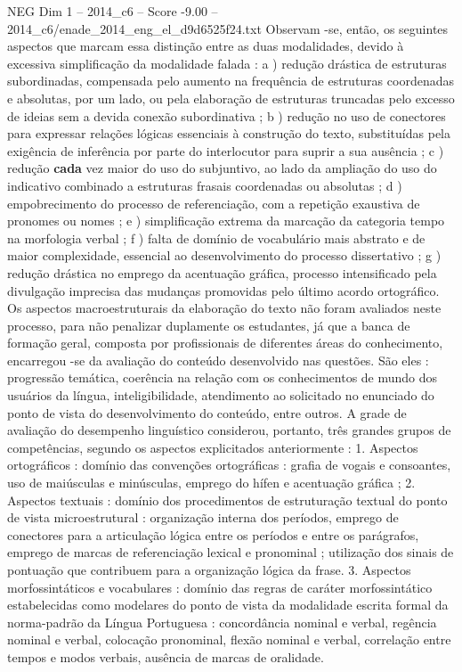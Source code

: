 \begin{textsample}{NEG Dim 1 – 2014\_c6 – Score -9.00 – 2014\_c6/enade\_2014\_eng\_el\_d9d6525f24.txt}
Observam -se, então, os seguintes aspectos que marcam essa distinção entre as duas modalidades, devido à excessiva simplificação da modalidade falada : a ) redução drástica de estruturas subordinadas, compensada pelo aumento na frequência de estruturas coordenadas e absolutas, por um lado, ou pela elaboração de estruturas truncadas pelo excesso de ideias sem a devida conexão subordinativa ; b ) redução no uso de conectores para expressar relações lógicas essenciais à construção do texto, substituídas pela exigência de inferência por parte do interlocutor para suprir a sua ausência ; c ) redução \textbf{cada} vez maior do uso do subjuntivo, ao lado da ampliação do uso do indicativo combinado a estruturas frasais coordenadas ou absolutas ; d ) empobrecimento do processo de referenciação, com a repetição exaustiva de pronomes ou nomes ; e ) simplificação extrema da marcação da categoria tempo na morfologia verbal ; f ) falta de domínio de vocabulário mais abstrato e de maior complexidade, essencial ao desenvolvimento do processo dissertativo ; g ) redução drástica no emprego da acentuação gráfica, processo intensificado pela divulgação imprecisa das mudanças promovidas pelo último acordo ortográfico.
Os aspectos macroestruturais da elaboração do texto não foram avaliados neste processo, para não penalizar duplamente os estudantes, já que a banca de formação geral, composta por profissionais de diferentes áreas do conhecimento, encarregou -se da avaliação do conteúdo desenvolvido nas questões.
São eles : progressão temática, coerência na relação com os conhecimentos de mundo dos usuários da língua, inteligibilidade, atendimento ao solicitado no enunciado do ponto de vista do desenvolvimento do conteúdo, entre outros.
A grade de avaliação do desempenho linguístico considerou, portanto, três grandes grupos de competências, segundo os aspectos explicitados anteriormente : 1.
Aspectos ortográficos : domínio das convenções ortográficas : grafia de vogais e consoantes, uso de maiúsculas e minúsculas, emprego do hífen e acentuação gráfica ; 2.
Aspectos textuais : domínio dos procedimentos de estruturação textual do ponto de vista microestrutural : organização interna dos períodos, emprego de conectores para a articulação lógica entre os períodos e entre os parágrafos, emprego de marcas de referenciação lexical e pronominal ; utilização dos sinais de pontuação que contribuem para a organização lógica da frase. 3.
Aspectos morfossintáticos e vocabulares : domínio das regras de caráter morfossintático estabelecidas como modelares do ponto de vista da modalidade escrita formal da norma-padrão da Língua Portuguesa : concordância nominal e verbal, regência nominal e verbal, colocação pronominal, flexão nominal e verbal, correlação entre tempos e modos verbais, ausência de marcas de oralidade.

\end{textsample}

